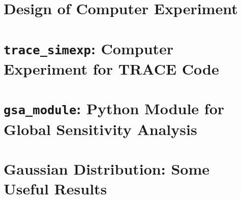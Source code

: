 \appendix
\chapter{Design of Computer Experiment}

\chapter{\texttt{trace\_simexp}: Computer Experiment for TRACE Code}

\chapter{\texttt{gsa\_module}: Python Module for Global Sensitivity Analysis}

\chapter{Gaussian Distribution: Some Useful Results}

\lipsum[1]
